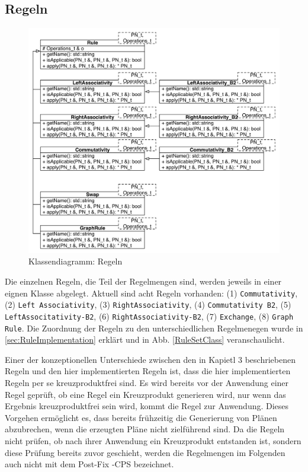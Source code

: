 \subsection{Regeln}

\begin{figure}[ht]
  \centering
  \includegraphics[height=\textwidth]{04_Implementierung/00_media/Rules.pdf}
  \caption{Klassendiagramm: Regeln}
  \label{RuleClassDiagram}
\end{figure}

Die einzelnen Regeln, die Teil der Regelmengen sind, werden jeweils in einer eignen Klasse abgelegt. Aktuell sind acht Regeln vorhanden: (1) \texttt{Commutativity}, (2) \texttt{Left Associativity}, (3) \texttt{Right\-Associativity}, (4) \texttt{Commu\-tativity B2}, (5) \texttt{Left\-Associtativity-B2}, (6) \texttt{Right\-Associativity-B2}, (7) \texttt{Exchange}, (8) \texttt{Graph Rule}. Die Zuordnung der Regeln zu den unterschiedlichen Regelmenegen wurde in \ref{sec:RuleImplementation} erklärt und in Abb. \ref{RuleSetClass} veranschaulicht.

Einer der konzeptionellen Unterschiede zwischen den in Kapietl 3 beschriebenen Regeln und den hier implementierten Regeln ist, dass die hier implementierten Regeln per se kreuzproduktfrei sind. Es wird bereits vor der Anwendung einer Regel geprüft, ob eine Regel ein Kreuzprodukt generieren wird, nur wenn das Ergebnis kreuzproduktfrei sein wird, kommt die Regel zur Anwendung. Dieses Vorgehen ermöglicht es, dass bereits frühzeitig die Generierung von Plänen abzubrechen, wenn die erzeugten Pläne nicht zielführend sind. Da die Regeln nicht prüfen, ob nach ihrer Anwendung ein Kreuzprodukt entstanden ist, sondern diese Prüfung bereits zuvor geschieht, werden die Regelmengen im Folgenden auch nicht mit dem Post-Fix -CPS bezeichnet.

